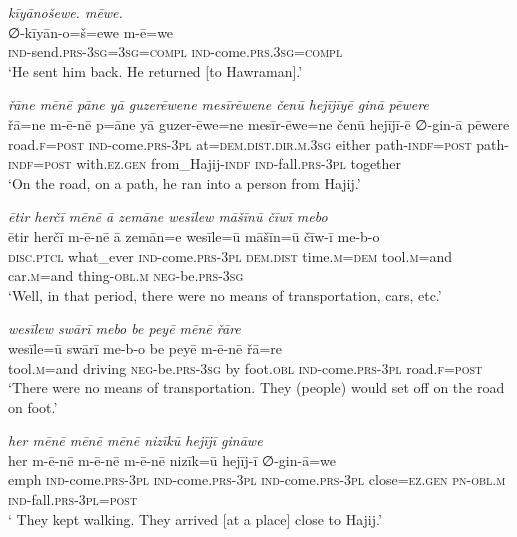 \ea \label{ŽP.96}
\textit{kīyānošewe. mēwe.} \\ 
\gll ∅-kīyān-o=š=ewe m-ē=we \\ 
 \textsc{ind-}send\textsc{.prs}\textsc{-3sg}\textsc{=3sg}\textsc{=compl} \textsc{ind-}come\textsc{.prs}\textsc{.3sg}\textsc{=compl} \\ 
\glt `He sent him back. He returned [to Hawraman].'
\z 
 
\ea \label{ŽP.97}
\textit{řāne mēnē pāne yā guzerēwene mesīrēwene čenū hejījīyē ginā pēwere} \\ 
\gll řā=ne m-ē-nē p=āne yā guzer-ēwe=ne mesīr-ēwe=ne čenū hejījī-ē ∅-gin-ā pēwere \\ 
 road\textsc{.f}\textsc{=\textsc{post}} \textsc{ind-}come\textsc{.prs}\textsc{-3pl} at=\textsc{dem.dist}\textsc{.dir}\textsc{.m}\textsc{.3sg} either path\textsc{-indf}\textsc{=\textsc{post}} path\textsc{-indf}\textsc{=\textsc{post}} with\textsc{.ez.gen} from\_Hajij\textsc{-indf} \textsc{ind-}fall\textsc{.prs}\textsc{-3pl} together \\ 
\glt `On the road, on a path, he ran into a person from Hajij.'
\z 
 
\ea \label{ŽP.98}
\textit{ētir herčī mēnē ā zemāne wesīlew māšīnū čīwī mebo} \\ 
\gll ētir herčī m-ē-nē ā zemān=e wesīle=ū māšīn=ū čīw-ī me-b-o \\ 
 \textsc{disc.ptcl} what\_ever \textsc{ind-}come\textsc{.prs}\textsc{-3pl} \textsc{dem.dist} time\textsc{.m}\textsc{=dem} tool\textsc{.m}=and car\textsc{.m}=and thing\textsc{-obl}\textsc{.m} \textsc{neg-}be\textsc{.prs}\textsc{-3sg} \\ 
\glt `Well, in that period, there were no means of transportation, cars, etc.'
\z 
 
\ea \label{ŽP.99}
\textit{wesīlew swārī mebo be peyē mēnē řāre} \\ 
\gll wesīle=ū swārī me-b-o be peyē m-ē-nē řā=re \\ 
 tool\textsc{.m}=and driving \textsc{neg-}be\textsc{.prs}\textsc{-3sg} by foot\textsc{.obl} \textsc{ind-}come\textsc{.prs}\textsc{-3pl} road\textsc{.f}\textsc{=\textsc{post}} \\ 
\glt `There were no means of transportation. They (people) would set off on the road on foot.'
\z 
 
\ea \label{ŽP.100}
\textit{her mēnē mēnē mēnē nizīkū hejījī gināwe} \\ 
\gll her m-ē-nē m-ē-nē m-ē-nē nizīk=ū hejīj-ī ∅-gin-ā=we \\ 
 emph \textsc{ind-}come\textsc{.prs}\textsc{-3pl} \textsc{ind-}come\textsc{.prs}\textsc{-3pl} \textsc{ind-}come\textsc{.prs}\textsc{-3pl} close\textsc{\textsc{=ez.gen}} \textsc{pn}\textsc{-obl}\textsc{.m} \textsc{ind-}fall\textsc{.prs}\textsc{-3pl}\textsc{=\textsc{post}} \\ 
\glt ` They kept walking. They arrived [at a place] close to Hajij.'
\z 
 
